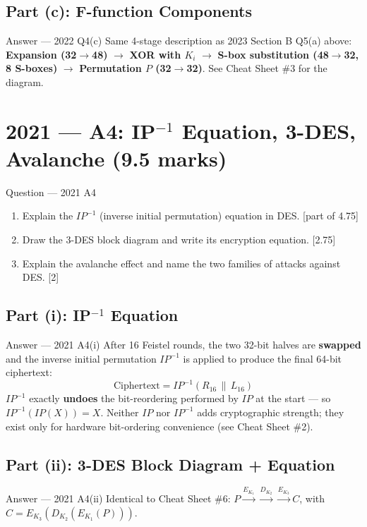 \documentclass[12pt,a4paper]{article}
\begin{document}
\subsection{Part (c): F-function Components}
\begin{solbox}{Answer --- 2022 Q4(c)}
Same 4-stage description as 2023 Section B Q5(a) above: \textbf{Expansion (32$\to$48)} $\to$ \textbf{XOR with $K_i$} $\to$ \textbf{S-box substitution (48$\to$32, 8 S-boxes)} $\to$ \textbf{Permutation $P$ (32$\to$32)}. See Cheat Sheet \#3 for the diagram.
\end{solbox}

\newpage
\section{2021 --- A4: IP$^{-1}$ Equation, 3-DES, Avalanche (9.5 marks)}

\begin{qbox}{Question --- 2021 A4}
\begin{enumerate}[label=(\roman*)]
  \item Explain the $IP^{-1}$ (inverse initial permutation) equation in DES. \hfill [part of 4.75]
  \item Draw the 3-DES block diagram and write its encryption equation. \hfill [2.75]
  \item Explain the avalanche effect and name the two families of attacks against DES. \hfill [2]
\end{enumerate}
\end{qbox}

\subsection{Part (i): IP$^{-1}$ Equation}
\begin{solbox}{Answer --- 2021 A4(i)}
After 16 Feistel rounds, the two 32-bit halves are \textbf{swapped} and the inverse initial permutation $IP^{-1}$ is applied to produce the final 64-bit ciphertext:
\[
\text{Ciphertext} = IP^{-1}(R_{16} \,\|\, L_{16})
\]
$IP^{-1}$ exactly \textbf{undoes} the bit-reordering performed by $IP$ at the start --- so $IP^{-1}(IP(X)) = X$. Neither $IP$ nor $IP^{-1}$ adds cryptographic strength; they exist only for hardware bit-ordering convenience (see Cheat Sheet \#2).
\end{solbox}

\subsection{Part (ii): 3-DES Block Diagram + Equation}
\begin{solbox}{Answer --- 2021 A4(ii)}
Identical to Cheat Sheet \#6: $P \xrightarrow{E_{K_1}} \xrightarrow{D_{K_2}} \xrightarrow{E_{K_3}} C$, with $C = E_{K_3}(D_{K_2}(E_{K_1}(P)))$.
\end{solbox}
\end{document}
